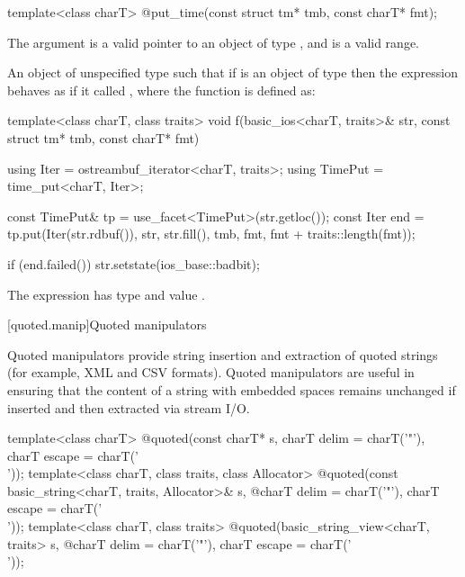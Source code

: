 %
\begin{itemdecl}
template<class charT> @\unspec@ put_time(const struct tm* tmb, const charT* fmt);
\end{itemdecl}

\begin{itemdescr}
\pnum
\expects
The argument  is a valid pointer to an object of type ,
and  is a valid range.

\pnum
\returns
An object of unspecified type such that if  is an object of
type  then the expression
 behaves as if it called ,
where the function  is defined as:

\begin{codeblock}
template<class charT, class traits>
void f(basic_ios<charT, traits>& str, const struct tm* tmb, const charT* fmt) {
  using Iter    = ostreambuf_iterator<charT, traits>;
  using TimePut = time_put<charT, Iter>;

  const TimePut& tp = use_facet<TimePut>(str.getloc());
  const Iter end = tp.put(Iter(str.rdbuf()), str, str.fill(), tmb,
    fmt, fmt + traits::length(fmt));

  if (end.failed())
    str.setstate(ios_base::badbit);
}
\end{codeblock}

The expression  has type
 and value .
\end{itemdescr}

[quoted.manip]{Quoted manipulators}

\pnum
\begin{note}
Quoted manipulators provide string insertion and extraction of quoted strings (for example, XML and CSV formats). Quoted manipulators are useful in ensuring that the content of a string with embedded spaces remains unchanged if inserted and then extracted via stream I/O.
\end{note}

%
\begin{itemdecl}
template<class charT>
  @\unspec@ quoted(const charT* s, charT delim = charT('"'), charT escape = charT('\\'));
template<class charT, class traits, class Allocator>
  @\unspec@ quoted(const basic_string<charT, traits, Allocator>& s,
  @\itcorr@                   charT delim = charT('"'), charT escape = charT('\\'));
template<class charT, class traits>
  @\unspec@ quoted(basic_string_view<charT, traits> s,
  @\itcorr@                   charT delim = charT('"'), charT escape = charT('\\'));
\end{itemdecl}

